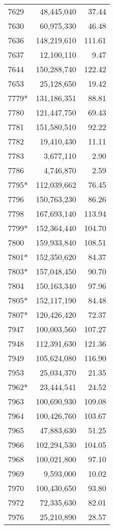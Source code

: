 \documentclass[11pt]{article}
\begin{document}
\begin{longtable}[!hbtp]{l r r}
7629  &  48,445,040  &  37.44\\
7630  &  60,975,330  &  46.48\\
7636  &  148,219,610  &  111.61\\
7637  &  12,100,110  &  9.47\\
7644  &  150,288,740  &  122.42\\
7653  &  25,128,650  &  19.42\\
7779*  &  131,186,351  &  88.81\\
7780  &  121,447,750  &  69.43\\
7781  &  151,580,510  &  92.22\\
7782  &  19,410,430  &  11.11\\
7783  &  3,677,110  &  2.90\\
7786  &  4,746,870  &  2.59\\
7795*  &  112,039,662  &  76.45\\
7796  &  150,763,230  &  86.26\\
7798  &  167,693,140  &  113.94\\
7799*  &  152,364,440  &  104.70\\
7800  &  159,933,840  &  108.51\\
7801*  &  152,350,620  &  84.37\\
7803*  &  157,048,450  &  90.70\\
7804  &  150,163,340  &  97.96\\
7805*  &  152,117,190  &  84.48\\
7807*  &  120,426,420  &  72.37\\
7947  &  100,003,560  &  107.27\\
7948  &  112,391,630  &  121.36\\
7949  &  105,624,080  &  116.90\\
7953  &  25,034,370  &  21.35\\
7962*  &  23,444,541  &  24.52\\
7963  &  100,690,930  &  109.08\\
7964  &  100,426,760  &  103.67\\
7965  &  47,883,630  &  51.25\\
7966  &  102,294,530  &  104.05\\
7968  &  100,021,800  &  97.10\\
7969  &  9,593,000  &  10.02\\
7970  &  100,430,650  &  93.80\\
7972  &  72,335,630  &  82.01\\
7976  &  25,210,890  &  28.57\\

\end{longtable}
\end{document}
